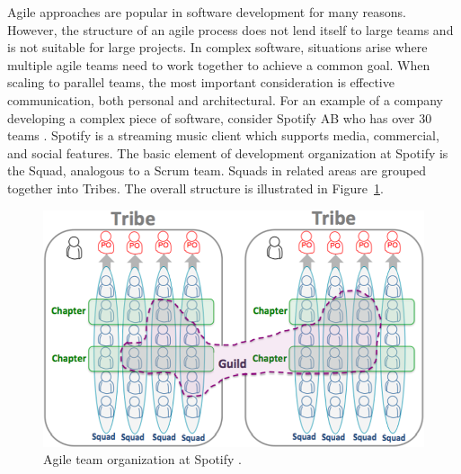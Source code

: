 
Agile approaches are popular in software development for many reasons.
However, the structure of an agile process does not lend itself to large teams and is not suitable for large projects.
In complex software, situations arise where multiple agile teams need to work together to achieve a common goal.
When scaling to parallel teams, the most important consideration is effective communication, both personal and architectural.
%
For an example of a company developing a complex piece of software, consider Spotify AB who has over 30 teams \cite{kniberg12}.
Spotify is a streaming music client which supports media, commercial, and social features.
The basic element of development organization at Spotify is the Squad, analogous to a Scrum team.
Squads in related areas are grouped together into Tribes. 
The overall structure is illustrated in Figure~\ref{fig:spotify_structure}.
\begin{figure}[h]
  \includegraphics[width=\linewidth]{images/kniberg12_structure.png}
  \caption{Agile team organization at Spotify \cite{kniberg12}.}
  \label{fig:spotify_structure}
\end{figure}


